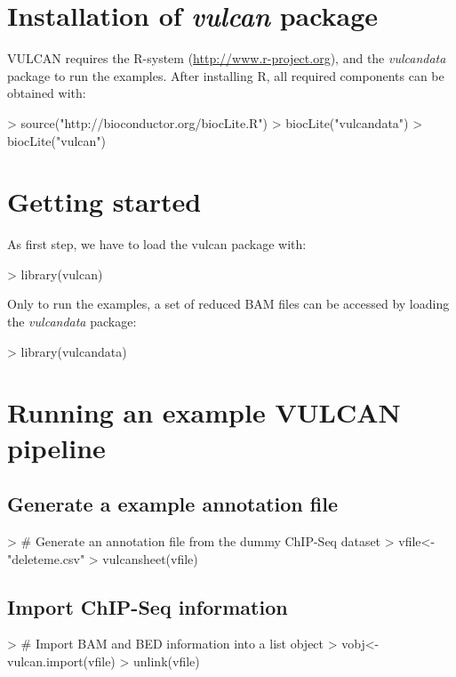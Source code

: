\documentclass{article}
\begin{document}
\section{Installation of \emph{vulcan} package}
VULCAN requires the R-system (\url{http://www.r-project.org}), and the \emph{vulcandata} package to run the examples.
After installing R, all required components can be obtained with:


\begin{Schunk}
\begin{Sinput}
> source("http://bioconductor.org/biocLite.R")
> biocLite("vulcandata")
> biocLite("vulcan")
\end{Sinput}
\end{Schunk}

\section{Getting started}
As first step, we have to load the vulcan package with:
\begin{Schunk}
\begin{Sinput}
> library(vulcan)
\end{Sinput}
\end{Schunk}
Only to run the examples, a set of reduced BAM files can be accessed by loading the \emph{vulcandata} package:
\begin{Schunk}
\begin{Sinput}
> library(vulcandata)
\end{Sinput}
\end{Schunk}


\section{Running an example VULCAN pipeline}

\subsection{Generate a example annotation file}
\begin{Schunk}
\begin{Sinput}
> # Generate an annotation file from the dummy ChIP-Seq dataset
> vfile<-"deleteme.csv"
> vulcansheet(vfile)
\end{Sinput}
\end{Schunk}

\subsection{Import ChIP-Seq information}
\begin{Schunk}
\begin{Sinput}
> # Import BAM and BED information into a list object
> vobj<-vulcan.import(vfile)
> unlink(vfile)
\end{Sinput}
\end{Schunk}
\end{document}
